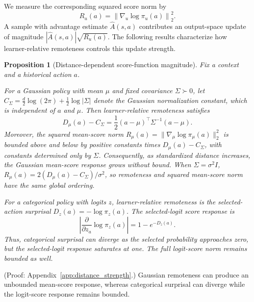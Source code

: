\documentclass{article}
\theoremstyle{plain}
\newtheorem{proposition}[theorem]{Proposition}
\theoremstyle{definition}
\theoremstyle{remark}
\begin{document}
We measure the corresponding squared score norm by
\begin{equation}
    R_u(a)
    =
    \left\|
        \nabla_u \log \pi_u(a)
    \right\|_2^2.
    \label{eq:score_strength}
\end{equation}
A sample with advantage estimate $\widehat{A}(s,a)$ contributes an
output-space update of magnitude
$|\widehat{A}(s,a)|\sqrt{R_u(a)}$.
The following results characterize how learner-relative remoteness
controls this update strength.

\begin{proposition}[Distance-dependent score-function magnitude]
\label{prop:distance_strength}
Fix a context and a historical action \(a\).

For a Gaussian policy with mean \(\mu\) and fixed covariance
\(\Sigma\succ0\), let
\(C_\Sigma=\frac{d}{2}\log(2\pi)+\frac12\log|\Sigma|\) denote the
Gaussian normalization constant, which is independent of \(a\) and
\(\mu\). Then learner-relative remoteness satisfies
\begin{equation}
    D_\mu(a)-C_\Sigma
    =
    \frac12
    (a-\mu)^\top\Sigma^{-1}(a-\mu).
    \label{eq:gaussian_remoteness_mahalanobis}
\end{equation}
Moreover, the squared mean-score norm
\(R_\mu(a)=\|\nabla_\mu\log\pi_\mu(a)\|_2^2\) is bounded above and below
by positive constants times \(D_\mu(a)-C_\Sigma\), with constants
determined only by \(\Sigma\). Consequently, as standardized distance
increases, the Gaussian mean-score response grows without bound. When
\(\Sigma=\sigma^2I\), \(R_\mu(a)=2(D_\mu(a)-C_\Sigma)/\sigma^2\), so
remoteness and squared mean-score norm have the same global ordering.

For a categorical policy with logits \(z\), learner-relative remoteness is
the selected-action surprisal \(D_z(a)=-\log\pi_z(a)\). The selected-logit
score response is
\begin{equation}
    \left|
    \frac{\partial}{\partial z_a}
    \log \pi_z(a)
    \right|
    =
    1-e^{-D_z(a)}.
    \label{eq:categorical_selected_score}
\end{equation}
Thus, categorical surprisal can diverge as the selected probability
approaches zero, but the selected-logit response saturates at one. The
full logit-score norm remains bounded as well.
\end{proposition}

(Proof: Appendix~\ref{app:distance_strength}.) Gaussian remoteness can
produce an unbounded mean-score response, whereas categorical surprisal can
diverge while the logit-score response remains bounded.
\end{document}
